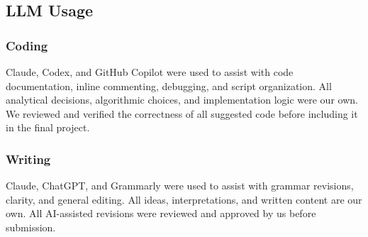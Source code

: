 \documentclass[11pt]{article}
\begin{document}
\subsection{LLM Usage}
\subsubsection*{Coding}
Claude, Codex, and GitHub Copilot were used to assist with code documentation, inline commenting, debugging, and script organization. All analytical decisions, algorithmic choices, and implementation logic were our own. We reviewed and verified the correctness of all suggested code before including it in the final project.

\subsubsection*{Writing}
Claude, ChatGPT, and Grammarly were used to assist with grammar revisions, clarity, and general editing. All ideas, interpretations, and written content are our own. All AI-assisted revisions were reviewed and approved by us before submission.
\end{document}
